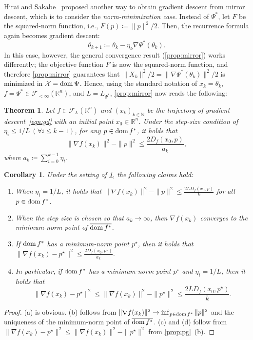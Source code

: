 \documentclass[11pt,a4paper]{article}
\theoremstyle{definition}
\theoremstyle{plain}
\newtheorem{thm}{Theorem}[section]
\newtheorem{cor}[cor]{Corollary}
\newcommand{\RR}{{\mathbb{R}}}
\newcommand{\NN}{{\mathbb{N}}}
\newcommand{\dom}{\mathop{\rm dom}}
\begin{document}
Hirai and Sakabe~\cite{HS2024} proposed another way to obtain gradient descent from mirror descent, which is to consider the \textit{norm-minimization case}.
Instead of $\Psi^\ast$, let $F$ be the squared-norm function, i.e., $F(p) \coloneqq \|p\|^2/2$.
Then, the recurrence formula again becomes gradient descent:
\[
    \theta_{k + 1} \coloneqq \theta_k - \eta_k\nabla\Psi^\ast(\theta_k).
\]
In this case, however, the general convergence result (\cref{prop:mirror}) works differently; the objective function $F$ is now the squared-norm function, and therefore \cref{prop:mirror} guarantees that $\|X_k\|^2/2 = \|\nabla\Psi^\ast(\theta_k)\|^2/2$ is minimized in $\mathcal{X} = \dom\Psi$.
Hence, using the standard notation of $x_k = \theta_k$, $f = \Psi^\ast \in \mathcal{F}_{<\infty}(\RR^n)$, and $L = L_{\Psi^\ast}$, \cref{prop:mirror} now reads the following:
\begin{thm}
    \label{thm:gradientdescent}
    Let $f \in \mathcal{F}_L(\RR^n)$ and $(x_k)_{k \in \NN}$ be the trajectory of gradient descent~\eqref{eqn:gd} with an initial point $x_0 \in \RR^n$.
    Under the step-size condition of $\eta_i \le 1/L\ (\forall i \le k - 1)$, for any $p \in \dom f^\ast$, it holds that
    \[
        \|\nabla f(x_k)\|^2 - \|p\|^2 \le \frac{2D_f(x_0, p)}{a_k},
    \]
    where $a_k \coloneqq \sum_{i = 0}^{k - 1}\eta_i$.
\end{thm}
\begin{cor}
    \label{cor:gradientdescent}
    Under the setting of \cref{thm:gradientdescent}, the following claims hold:
    \begin{enumerate}
        \item[(a)] When $\eta_i = 1/L$, it holds that $\|\nabla f(x_k)\|^2 - \|p\|^2 \le \frac{2LD_f(x_0, p)}k$ for all $p \in \dom f^\ast$.
        \item[(b)] When the step size is chosen so that $a_k \to \infty$, then $\nabla f(x_k)$ converges to the minimum-norm point of $\overline{\dom f^\ast}$.
        \item[(c)] If $\dom f^\ast$ has a minimum-norm point $p^\star$, then it holds that $\|\nabla f(x_k) - p^\star\|^2 \le \frac{2D_f(x_0, p^\star)}{a_k}$.
        \item[(d)] In particular, if $\dom f^\ast$ has a minimum-norm point $p^\star$ and $\eta_i = 1/L$, then it holds that
        \[
            \|\nabla f(x_k) - p^\star\|^2 \le \|\nabla f(x_k)\|^2 - \|p^\star\|^2 \le \frac{2LD_f(x_0, p^\star)}k.
        \]
    \end{enumerate}
\end{cor}
\begin{proof}
    (a) is obvious.
    (b) follows from $\|\nabla f(x_k)\|^2 \to \inf_{p \in \dom f^\ast}\|p\|^2$ and the uniqueness of the minimum-norm point of $\overline{\dom f^\ast}$.
    (c) and (d) follow from $\|\nabla f(x_k) - p^\star\|^2 \le \|\nabla f(x_k)\|^2 - \|p^\star\|^2$ from \cref{prop:pg}~(b).
\end{proof}
\end{document}
